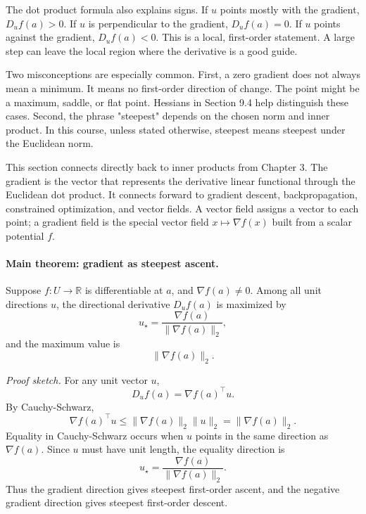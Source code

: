 The dot product formula also explains signs. If \(u\) points mostly with the gradient, \(D_u f(a)>0\). If \(u\) is perpendicular to the gradient, \(D_u f(a)=0\). If \(u\) points against the gradient, \(D_u f(a)<0\). This is a local, first-order statement. A large step can leave the local region where the derivative is a good guide.

Two misconceptions are especially common. First, a zero gradient does not always mean a minimum. It means no first-order direction of change. The point might be a maximum, saddle, or flat point. Hessians in Section 9.4 help distinguish these cases. Second, the phrase "steepest" depends on the chosen norm and inner product. In this course, unless stated otherwise, steepest means steepest under the Euclidean norm.

This section connects directly back to inner products from Chapter 3. The gradient is the vector that represents the derivative linear functional through the Euclidean dot product. It connects forward to gradient descent, backpropagation, constrained optimization, and vector fields. A vector field assigns a vector to each point; a gradient field is the special vector field \(x\mapsto\nabla f(x)\) built from a scalar potential \(f\).

\paragraph{Main theorem: gradient as steepest ascent.}
Suppose \(f:U\to\mathbb{R}\) is differentiable at \(a\), and \(\nabla f(a)\neq0\). Among all unit directions \(u\), the directional derivative \(D_u f(a)\) is maximized by
\[
u_\star=\frac{\nabla f(a)}{\|\nabla f(a)\|_2},
\]
and the maximum value is
\[
\|\nabla f(a)\|_2.
\]

\emph{Proof sketch.} For any unit vector \(u\),
\[
D_u f(a)=\nabla f(a)^\top u.
\]
By Cauchy-Schwarz,
\[
\nabla f(a)^\top u\leq \|\nabla f(a)\|_2\|u\|_2=\|\nabla f(a)\|_2.
\]
Equality in Cauchy-Schwarz occurs when \(u\) points in the same direction as \(\nabla f(a)\). Since \(u\) must have unit length, the equality direction is
\[
u_\star=\frac{\nabla f(a)}{\|\nabla f(a)\|_2}.
\]
Thus the gradient direction gives steepest first-order ascent, and the negative gradient direction gives steepest first-order descent.

